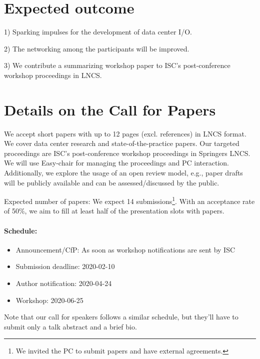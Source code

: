 \documentclass[a4paper,10pt]{article}
\begin{document}
\section{Expected outcome}
1) Sparking impulses for the development of data center I/O.

2) The networking among the participants will be improved.

3) We contribute a summarizing workshop paper to ISC's post-conference workshop proceedings in LNCS.

\section{Details on the Call for Papers}

We accept short papers with up to 12 pages (excl. references) in LNCS format.
We cover data center research and state-of-the-practice papers.
Our targeted proceedings are ISC's post-conference workshop proceedings in Springers LNCS.
We will use Easy-chair for managing the proceedings and PC interaction.
Additionally, we explore the usage of an open review model, e.g., paper drafts will be publicly available and can be assessed/discussed by the public.

Expected number of papers: We expect 14 submissions\footnote{We invited the PC to submit papers and have external agreements.}.
With an acceptance rate of 50\%, we aim to fill at least half of the presentation slots with papers.

\paragraph{Schedule:}
\begin{itemize}
  \item Announcement/CfP: As soon as workshop notifications are sent by ISC
  \item Submission deadline: 2020-02-10
  \item Author notification: 2020-04-24
  \item Workshop: 2020-06-25
\end{itemize}
Note that our call for speakers follows a similar schedule, but they'll have to submit only a talk abstract and a brief bio.
\end{document}
